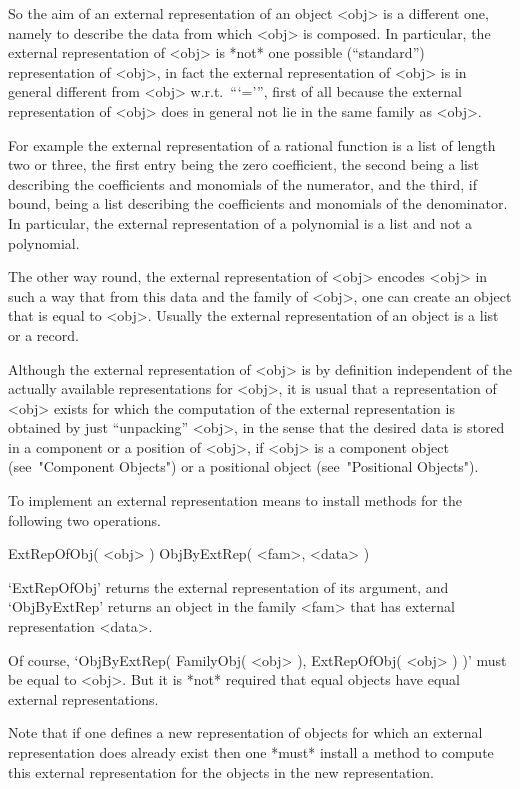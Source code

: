 So the aim of an external representation of an object <obj> is a
different one, namely to describe the data from which <obj> is composed.
In particular, the external representation of <obj> is *not* one possible
(``standard'') representation of <obj>,
in fact the external representation of <obj> is in general different
from <obj> w.r.t.~```=''',
first  of all because the external representation of <obj> does in general
not lie in the same family as <obj>.

For example the external representation of a rational function is a list
of length two or three, the first entry being the zero coefficient,
the second being a list describing the coefficients and monomials of the
numerator, and the third, if bound, being a list describing the coefficients
and monomials of the denominator.
In particular, the external representation of a polynomial is a list
and not a polynomial.

The other way round, the external representation of <obj> encodes <obj>
in such a way that from this data and the family of <obj>,
one can create an object that is equal to <obj>.
Usually the external representation of an object is a list or a record.

Although the external representation of <obj> is by definition independent
of the actually available representations for <obj>,
it is usual that a representation of <obj> exists for which the
computation of the external representation is obtained by just
``unpacking'' <obj>,
in the sense that the desired data is stored in a component or a position
of <obj>, if <obj> is a component object (see~"Component Objects")
or a positional object (see~"Positional Objects").

To implement an external representation means to install methods for the
following two operations.

\>ExtRepOfObj( <obj> )
\>ObjByExtRep( <fam>, <data> )

`ExtRepOfObj' returns the external representation of its argument,
and `ObjByExtRep' returns an object in the family <fam> that has
external representation <data>.

Of course, `ObjByExtRep( FamilyObj( <obj> ), ExtRepOfObj( <obj> ) )'
must be equal to <obj>.
But it is *not* required that equal objects have equal external
representations.

Note that if one defines a new representation of objects for which an
external representation does already exist
then one *must* install a method to compute this external representation
for the objects in the new representation.

